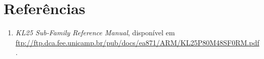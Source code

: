 \section*{Referências}

\begin {enumerate}
  \item \label{bib:manual} \textit{KL25 Sub-Family Reference Manual}, 
  disponível em
  \url{ftp://ftp.dca.fee.unicamp.br/pub/docs/ea871/ARM/KL25P80M48SF0RM.pdf}.
\end{enumerate}